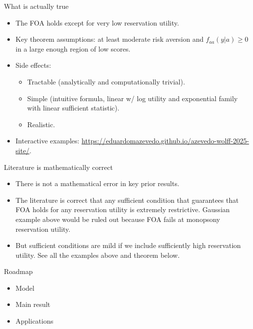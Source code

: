 \documentclass[12pt,aspectratio=169,t]{beamer}
\begin{document}
\begin{frame}{What is actually true}
  \begin{itemize}
    \item The FOA holds except for very low reservation utility.
    \item Key theorem assumptions: at least moderate risk aversion and $f_{aa}(y|a) \geq 0$ in a large enough region of low scores.
    \item Side effects:
    \begin{itemize}
      \item \textcolor{accentred}{Tractable} (analytically and computationally trivial).
      \item \textcolor{accentred}{Simple} (intuitive formula, linear w/ log utility and exponential family with linear sufficient statistic).
      \item \textcolor{accentred}{Realistic}.
    \end{itemize}
    \item Interactive examples: \url{https://eduardomazevedo.github.io/azevedo-wolff-2025-site/}.
  \end{itemize}
\end{frame}

\begin{frame}{Literature is mathematically correct}
  \begin{itemize}
    \item There is not a mathematical error in key prior results.
    \item The literature is correct that any sufficient condition that guarantees that FOA holds for any reservation utility is extremely restrictive. Gaussian example above would be ruled out because FOA fails at monopsony reservation utility.
    \item But sufficient conditions are mild if we include sufficiently high reservation utility. See all the examples above and theorem below.
  \end{itemize}
\end{frame}

\begin{frame}{Roadmap}
  \begin{itemize}
    \item \textcolor{alert}{Model}
    \item Main result
    \item Applications
  \end{itemize}
\end{frame}
\end{document}
